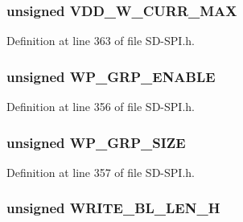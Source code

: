 \subsubsection[{V\+D\+D\+\_\+\+W\+\_\+\+C\+U\+R\+R\+\_\+\+M\+A\+X}]{\setlength{\rightskip}{0pt plus 5cm}unsigned V\+D\+D\+\_\+\+W\+\_\+\+C\+U\+R\+R\+\_\+\+M\+A\+X}\label{union_c_s_d_a7f2e270517fb1eac386c5c030342230f}


Definition at line 363 of file S\+D-\/\+S\+P\+I.\+h.

\hypertarget{union_c_s_d_a54e1bd0baf661cae3d264544133247d0}{}
\subsubsection[{W\+P\+\_\+\+G\+R\+P\+\_\+\+E\+N\+A\+B\+L\+E}]{\setlength{\rightskip}{0pt plus 5cm}unsigned W\+P\+\_\+\+G\+R\+P\+\_\+\+E\+N\+A\+B\+L\+E}\label{union_c_s_d_a54e1bd0baf661cae3d264544133247d0}


Definition at line 356 of file S\+D-\/\+S\+P\+I.\+h.

\hypertarget{union_c_s_d_a8d25931881f80fde567fa09a97865f65}{}
\subsubsection[{W\+P\+\_\+\+G\+R\+P\+\_\+\+S\+I\+Z\+E}]{\setlength{\rightskip}{0pt plus 5cm}unsigned W\+P\+\_\+\+G\+R\+P\+\_\+\+S\+I\+Z\+E}\label{union_c_s_d_a8d25931881f80fde567fa09a97865f65}


Definition at line 357 of file S\+D-\/\+S\+P\+I.\+h.

\hypertarget{union_c_s_d_acd5655503cdf3ba80f9110d578225598}{}
\subsubsection[{W\+R\+I\+T\+E\+\_\+\+B\+L\+\_\+\+L\+E\+N\+\_\+\+H}]{\setlength{\rightskip}{0pt plus 5cm}unsigned W\+R\+I\+T\+E\+\_\+\+B\+L\+\_\+\+L\+E\+N\+\_\+\+H}\label{union_c_s_d_acd5655503cdf3ba80f9110d578225598}


